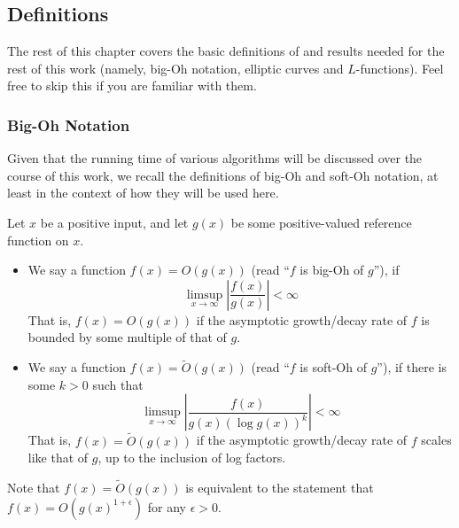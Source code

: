 \documentclass[10pt]{article}
\begin{document}
\newpage
\subsection{Definitions}

The rest of this chapter covers the basic definitions of and results needed for the rest of this work (namely, big-Oh notation, elliptic curves and $L$-functions). Feel free to skip this if you are familiar with them.

\subsubsection{Big-Oh Notation}

Given that the running time of various algorithms will be discussed over the course of this work, we recall the definitions of big-Oh and soft-Oh notation, at least in the context of how they will be used here.

\begin{definition}
Let $x$ be a positive input, and let $g(x)$ be some positive-valued reference function on $x$.
\begin{itemize}
\item We say a function $f(x) = O(g(x))$ (read ``$f$ is big-Oh of $g$''), if
\begin{equation}
\limsup_{x \to \infty} \left| \frac{f(x)}{g(x)}\right| < \infty
\end{equation}
That is, $f(x) = O(g(x))$ if the asymptotic growth/decay rate of $f$ is bounded by some multiple of that of $g$.
\item We say a function $f(x) = \tilde{O}(g(x))$ (read ``$f$ is soft-Oh of $g$''), if there is some $k>0$ such that
\begin{equation}
\limsup_{x \to \infty} \left| \frac{f(x)}{g(x)\left(\log g(x)\right)^k}\right| < \infty
\end{equation}
That is, $f(x) = \tilde{O}(g(x))$ if the asymptotic growth/decay rate of $f$ scales like that of $g$, up to the inclusion of log factors.
\end{itemize}
\end{definition}
Note that $f(x) = \tilde{O}(g(x))$ is equivalent to the statement that $f(x) = O(g(x)^{1+\epsilon})$ for any $\epsilon>0$. \\
\end{document}
